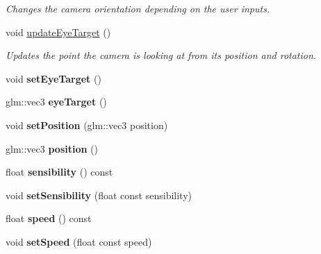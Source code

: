\begin{DoxyCompactItemize}
\begin{DoxyCompactList}\small\item\em Changes the camera orientation depending on the user inputs. \end{DoxyCompactList}\item 
\hypertarget{classCamera_afff594534eab1614a3045e6dbf030323}{}void \hyperlink{classCamera_afff594534eab1614a3045e6dbf030323}{update\+Eye\+Target} ()\label{classCamera_afff594534eab1614a3045e6dbf030323}

\begin{DoxyCompactList}\small\item\em Updates the point the camera is looking at from its position and rotation. \end{DoxyCompactList}\item 
\hypertarget{classCamera_afe1507a03bc72df5325bc6bf2ae2b22d}{}void {\bfseries set\+Eye\+Target} ()\label{classCamera_afe1507a03bc72df5325bc6bf2ae2b22d}

\item 
\hypertarget{classCamera_a1aeeadf5c83ad322746dbab2aea31625}{}glm\+::vec3 {\bfseries eye\+Target} ()\label{classCamera_a1aeeadf5c83ad322746dbab2aea31625}

\item 
\hypertarget{classCamera_abe8633adb8475cb7c62e1a12743a1025}{}void {\bfseries set\+Position} (glm\+::vec3 position)\label{classCamera_abe8633adb8475cb7c62e1a12743a1025}

\item 
\hypertarget{classCamera_a34977bb92f9318343d8b706faa64b399}{}glm\+::vec3 {\bfseries position} ()\label{classCamera_a34977bb92f9318343d8b706faa64b399}

\item 
\hypertarget{classCamera_a46344382b241bebe8b091bb810938133}{}float {\bfseries sensibility} () const \label{classCamera_a46344382b241bebe8b091bb810938133}

\item 
\hypertarget{classCamera_ac25cb204a2aeff72f143836d27eeae4a}{}void {\bfseries set\+Sensibility} (float const sensibility)\label{classCamera_ac25cb204a2aeff72f143836d27eeae4a}

\item 
\hypertarget{classCamera_a9d5f5bfa927044db06ce687b0c00173e}{}float {\bfseries speed} () const \label{classCamera_a9d5f5bfa927044db06ce687b0c00173e}

\item 
\hypertarget{classCamera_afad82ebb393903702a11076b905bbbe5}{}void {\bfseries set\+Speed} (float const speed)\label{classCamera_afad82ebb393903702a11076b905bbbe5}


\end{DoxyCompactItemize}
